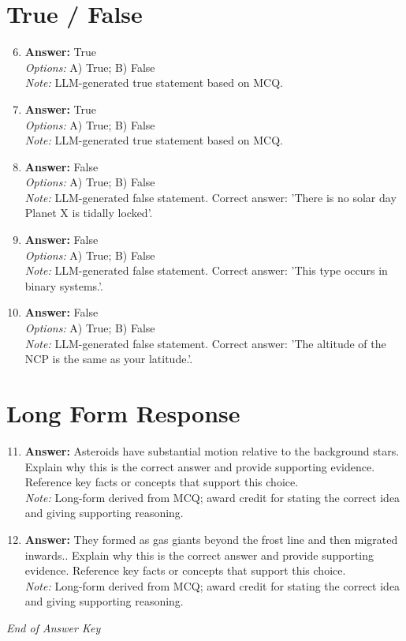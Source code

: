 \documentclass[12pt]{article}
\begin{document}
\section*{True / False}
\begin{enumerate}[label=\arabic*.]
\setcounter{enumi}{5}
\item \textbf{Answer:} True
\\ \textit{Options:} A) True; B) False
\\ \textit{Note:} LLM-generated true statement based on MCQ.
\item \textbf{Answer:} True
\\ \textit{Options:} A) True; B) False
\\ \textit{Note:} LLM-generated true statement based on MCQ.
\item \textbf{Answer:} False
\\ \textit{Options:} A) True; B) False
\\ \textit{Note:} LLM-generated false statement. Correct answer: 'There is no solar day Planet X is tidally locked'.
\item \textbf{Answer:} False
\\ \textit{Options:} A) True; B) False
\\ \textit{Note:} LLM-generated false statement. Correct answer: 'This type occurs in binary systems.'.
\item \textbf{Answer:} False
\\ \textit{Options:} A) True; B) False
\\ \textit{Note:} LLM-generated false statement. Correct answer: 'The altitude of the NCP is the same as your latitude.'.
\end{enumerate}

\section*{Long Form Response}
\begin{enumerate}[label=\arabic*.]
\setcounter{enumi}{10}
\item \textbf{Answer:} Asteroids have substantial motion relative to the background stars. Explain why this is the correct answer and provide supporting evidence. Reference key facts or concepts that support this choice.
\\ \textit{Note:} Long-form derived from MCQ; award credit for stating the correct idea and giving supporting reasoning.
\item \textbf{Answer:} They formed as gas giants beyond the frost line and then migrated inwards.. Explain why this is the correct answer and provide supporting evidence. Reference key facts or concepts that support this choice.
\\ \textit{Note:} Long-form derived from MCQ; award credit for stating the correct idea and giving supporting reasoning.
\end{enumerate}

\vfill
\noindent\textit{End of Answer Key}
\end{document}
